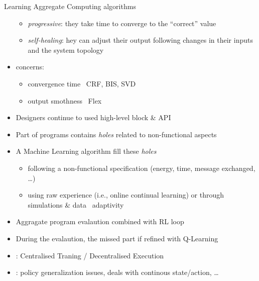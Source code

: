 \documentclass[8pt, aspectratio=169, handout]{beamer}
\begin{document}
\begin{frame}[allowframebreaks]{Learning Aggregate Computing algorithms}
\begin{card}
\begin{itemize}
\begin{itemize}
        \item \emph{progressive}: they take time  to converge to the ``correct'' value
        \item \emph{self-healing}: hey can adjust their output following changes in
        their inputs and the system topology
      \end{itemize}
      \item {} concerns:
      \begin{itemize}
        \item convergence time \faArrowRight \, CRF, BIS, SVD
        \item output smothness \faArrowRight \, Flex
      \end{itemize}
    \end{itemize}
  \end{card}
  \begin{card}
    \begin{itemize}
      \item Designers continue to used high-level block \& API
      \item Part of programs contains \emph{holes} related to non-functional aspects
      \item A Machine Learning algorithm fill these \emph{holes}
      \begin{itemize}
        \item following a non-functional specification (energy, time, message exchanged, \dots)
        \item using raw experience (i.e., online continual learning) or through simulations \& data \faArrowRight \, adaptivity
      \end{itemize}
    \end{itemize}
  \end{card}
  \framebreak
  \begin{card}
    \begin{itemize}
      \item Aggragate program evalaution combined with RL loop
      \item During the evalaution, the missed part if refined with Q-Learning
      \item {}: Centralised Traning / Decentralised Execution
      \item {}: policy generalization issues, deals with continous state/action, \dots
    \end{itemize}
  \end{card}
  \centering
\end{frame}
\end{document}
